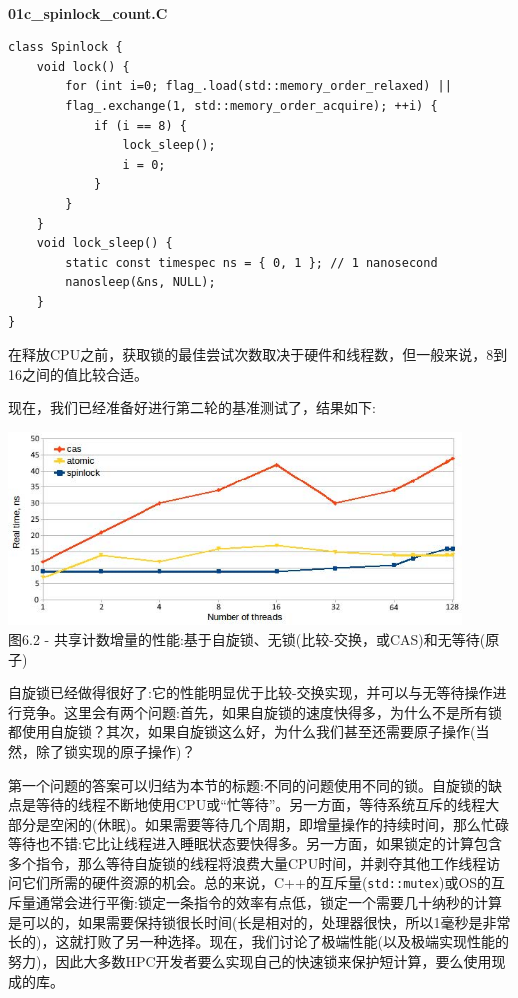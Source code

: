 \hspace*{\fill} \\ %
\noindent
\textbf{01c\_spinlock\_count.C}
\begin{lstlisting}[style=styleCXX]
class Spinlock {
	void lock() {
		for (int i=0; flag_.load(std::memory_order_relaxed) ||
		flag_.exchange(1, std::memory_order_acquire); ++i) {
			if (i == 8) {
				lock_sleep();
				i = 0;
			}
		}
	}
	void lock_sleep() {
		static const timespec ns = { 0, 1 }; // 1 nanosecond
		nanosleep(&ns, NULL);
	}
}
\end{lstlisting}

在释放CPU之前，获取锁的最佳尝试次数取决于硬件和线程数，但一般来说，8到16之间的值比较合适。

现在，我们已经准备好进行第二轮的基准测试了，结果如下:

\begin{center}
\includegraphics[width=0.9\textwidth]{content/2/chapter6/images/2.jpg}\\
图6.2 - 共享计数增量的性能:基于自旋锁、无锁(比较-交换，或CAS)和无等待(原子)
\end{center}

自旋锁已经做得很好了:它的性能明显优于比较-交换实现，并可以与无等待操作进行竞争。这里会有两个问题:首先，如果自旋锁的速度快得多，为什么不是所有锁都使用自旋锁？其次，如果自旋锁这么好，为什么我们甚至还需要原子操作(当然，除了锁实现的原子操作)？

第一个问题的答案可以归结为本节的标题:不同的问题使用不同的锁。自旋锁的缺点是等待的线程不断地使用CPU或“忙等待”。另一方面，等待系统互斥的线程大部分是空闲的(休眠)。如果需要等待几个周期，即增量操作的持续时间，那么忙碌等待也不错:它比让线程进入睡眠状态要快得多。另一方面，如果锁定的计算包含多个指令，那么等待自旋锁的线程将浪费大量CPU时间，并剥夺其他工作线程访问它们所需的硬件资源的机会。总的来说，C++的互斥量(\texttt{std::mutex})或OS的互斥量通常会进行平衡:锁定一条指令的效率有点低，锁定一个需要几十纳秒的计算是可以的，如果需要保持锁很长时间(长是相对的，处理器很快，所以1毫秒是非常长的)，这就打败了另一种选择。现在，我们讨论了极端性能(以及极端实现性能的努力)，因此大多数HPC开发者要么实现自己的快速锁来保护短计算，要么使用现成的库。

